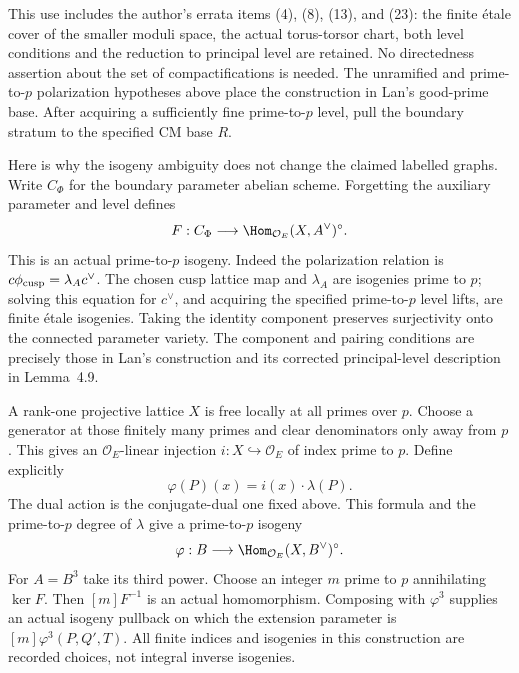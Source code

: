 \documentclass[11pt]{article}
\theoremstyle{definition}\newtheorem{definition}[theorem]{Definition}\newtheorem{remark}[theorem]{Remark}
\begin{document}
This use includes the author's errata items (4), (8), (13),
and (23): the finite \'etale cover of the smaller
moduli space, the actual torus-torsor chart, both level
conditions and the reduction to principal level are retained.
No directedness assertion about the set of compactifications
is needed. The unramified and prime-to-$p$ polarization
hypotheses above place the construction in Lan's good-prime
base. After acquiring a sufficiently fine prime-to-$p$ level,
pull the boundary stratum to the specified CM base $R$.

Here is why the isogeny ambiguity does not change the claimed
labelled graphs. Write $C_\Phi$ for the boundary parameter
abelian scheme. Forgetting the auxiliary parameter and level
defines
\[
 F:C_\Phi\longrightarrow
       \Hom_{\mathcal O_E}(X,A^\vee)^\circ.
\]
This is an actual prime-to-$p$ isogeny. Indeed the polarization
relation is $c\phi_{\rm cusp}=\lambda_Ac^\vee$. The chosen
cusp lattice map and $\lambda_A$ are isogenies prime to $p$;
solving this equation for $c^\vee$, and acquiring the specified
prime-to-$p$ level lifts, are finite \'etale isogenies.
Taking the identity component preserves surjectivity onto the
connected parameter variety. The component and pairing
conditions are precisely those in Lan's construction and its
corrected principal-level description in Lemma~4.9.

A rank-one projective lattice $X$ is free locally at all
primes over $p$. Choose a generator at those finitely many
primes and clear denominators only away from $p$. This gives
an $\mathcal O_E$-linear injection $i:X\hookrightarrow
\mathcal O_E$ of index prime to $p$. Define explicitly
\[
        \varphi(P)(x)=i(x)\cdot\lambda(P).
\]
The dual action is the conjugate-dual one fixed above.
This formula and the prime-to-$p$ degree of $\lambda$ give
a prime-to-$p$ isogeny
\[
       \varphi:B\longrightarrow
               \Hom_{\mathcal O_E}(X,B^\vee)^\circ.
\]
For $A=B^3$ take its third power. Choose an integer $m$
prime to $p$ annihilating $\ker F$.
Then $[m]F^{-1}$ is an actual homomorphism. Composing with
$\varphi^3$ supplies an actual isogeny pullback on which
the extension parameter is $[m]\varphi^3(P,Q',T)$.
All finite indices and isogenies in this construction are
recorded choices, not integral inverse isogenies.
\end{document}
